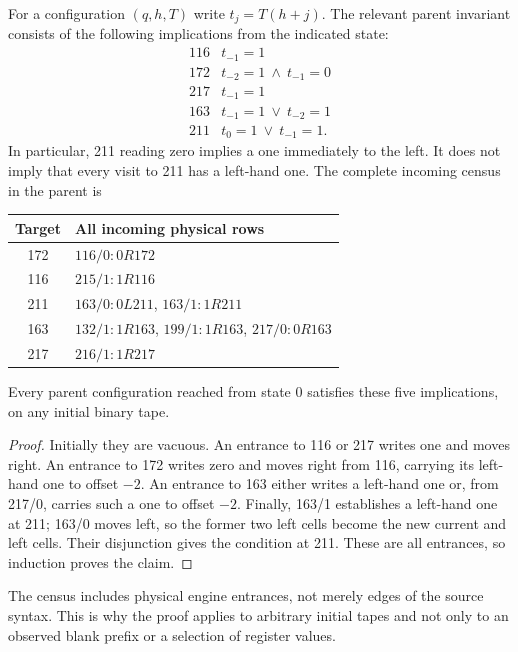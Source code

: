 \documentclass[11pt,letterpaper]{article}
\begin{document}
For a configuration $(q,h,T)$ write $t_j=T(h+j)$. The relevant parent invariant
consists of the following implications from the indicated state:
\[
\begin{array}{c|l}
116&t_{-1}=1\\
172&t_{-2}=1\ \land\ t_{-1}=0\\
217&t_{-1}=1\\
163&t_{-1}=1\ \lor\ t_{-2}=1\\
211&t_0=1\ \lor\ t_{-1}=1.
\end{array}
\]
In particular, 211 reading zero implies a one immediately to the left. It does
not imply that every visit to 211 has a left-hand one. The complete incoming
census in the parent is
\begin{center}\small\begin{tabular}{cl}\toprule
Target & All incoming physical rows\\\midrule
172 & $116/0:0R172$\\
116 & $215/1:1R116$\\
211 & $163/0:0L211$, $163/1:1R211$\\
163 & $132/1:1R163$, $199/1:1R163$, $217/0:0R163$\\
217 & $216/1:1R217$\\\bottomrule
\end{tabular}\end{center}
\begin{lemma}
Every parent configuration reached from state 0 satisfies these five
implications, on any initial binary tape.
\end{lemma}
\begin{proof}
Initially they are vacuous. An entrance to 116 or 217 writes one and moves
right. An entrance to 172 writes zero and moves right from 116, carrying its
left-hand one to offset $-2$. An entrance to 163 either writes a left-hand one
or, from 217/0, carries such a one to offset $-2$. Finally, 163/1 establishes
a left-hand one at 211; 163/0 moves left, so the former two left cells become
the new current and left cells. Their disjunction gives the condition at 211.
These are all entrances, so induction proves the claim.
\end{proof}
The census includes physical engine entrances, not merely edges of the source
syntax. This is why the proof applies to arbitrary initial tapes and not only
to an observed blank prefix or a selection of register values.

\clearpage
\end{document}
